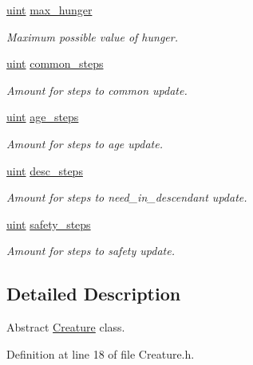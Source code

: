\begin{DoxyCompactItemize}
\hyperlink{BasicTypes_8h_a91ad9478d81a7aaf2593e8d9c3d06a14}{uint} \hyperlink{classCreature_a49691e6b47ba6704b980963ab63c1881}{max\-\_\-hunger}
\begin{DoxyCompactList}\small\item\em Maximum possible value of hunger. \end{DoxyCompactList}\item 
\hyperlink{BasicTypes_8h_a91ad9478d81a7aaf2593e8d9c3d06a14}{uint} \hyperlink{classCreature_aa1c351d6da7f1df976efb27fe21d5014}{common\-\_\-steps}
\begin{DoxyCompactList}\small\item\em Amount for steps to common update. \end{DoxyCompactList}\item 
\hyperlink{BasicTypes_8h_a91ad9478d81a7aaf2593e8d9c3d06a14}{uint} \hyperlink{classCreature_aa9bf4d151801ecb1326cd734b341167d}{age\-\_\-steps}
\begin{DoxyCompactList}\small\item\em Amount for steps to age update. \end{DoxyCompactList}\item 
\hyperlink{BasicTypes_8h_a91ad9478d81a7aaf2593e8d9c3d06a14}{uint} \hyperlink{classCreature_ad80371401e4349fd4c5b05367964b530}{desc\-\_\-steps}
\begin{DoxyCompactList}\small\item\em Amount for steps to need\-\_\-in\-\_\-descendant update. \end{DoxyCompactList}\item 
\hyperlink{BasicTypes_8h_a91ad9478d81a7aaf2593e8d9c3d06a14}{uint} \hyperlink{classCreature_a0781a2fc0015b162482cc3f92aae3ec8}{safety\-\_\-steps}
\begin{DoxyCompactList}\small\item\em Amount for steps to safety update. \end{DoxyCompactList}\end{DoxyCompactItemize}


\subsection{Detailed Description}
Abstract \hyperlink{classCreature}{Creature} class. 

Definition at line 18 of file Creature.\-h.



